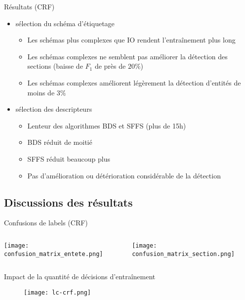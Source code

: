 \begin{frame}[t]{\mysubsectiontitle}
	Résultats (CRF)
	
	\begin{itemize}
		\item sélection du schéma d'étiquetage
		\begin{itemize}
			\item Les schémas plus complexes que IO rendent l'entraînement plus long
			\item Les schémas complexes ne semblent pas améliorer la détection des sections (baisse de $F_1$ de près de $20\%$)
			\item Les schémas complexes améliorent légèrement la détection d'entités de moins de $3\%$
		\end{itemize}
		\item sélection des descripteurs
		\begin{itemize}
			\item Lenteur des algorithmes BDS et SFFS (plus de 15h)
			\item BDS réduit de moitié
			\item SFFS réduit beaucoup plus
			\item Pas d'amélioration ou détérioration considérable de la détection
		\end{itemize}
	\end{itemize}
\end{frame}

\subsection{Discussions des résultats}
\begin{frame}[t]{\mysubsectiontitle}
	Confusions de labels (CRF)
	
	{}
\begin{columns}\tiny
	\begin{column}{.68\linewidth}
		\texttt{[image: confusion\_matrix\_entete.png]} 
	\end{column}
	\begin{column}{.3\linewidth}
		\texttt{[image: confusion\_matrix\_section.png]}
	\end{column}
\end{columns}
\end{frame}

\begin{frame}[t]{\mysubsectiontitle}
	Impact de la quantité de décisions d'entraînement
	
\begin{figure}[!h]
\texttt{[image: lc-crf.png]}
\end{figure}
\end{frame}

